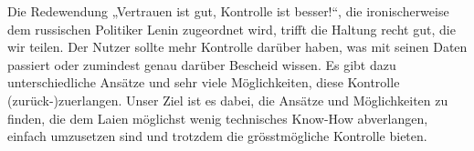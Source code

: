 Die Redewendung „Vertrauen ist gut, Kontrolle ist besser!“, die ironischerweise dem russischen Politiker Lenin zugeordnet wird, trifft die Haltung recht gut, die wir teilen. Der Nutzer sollte mehr Kontrolle darüber haben, was mit seinen Daten passiert oder zumindest genau darüber Bescheid wissen. Es gibt dazu unterschiedliche Ansätze und sehr viele Möglichkeiten, diese Kontrolle (zurück-)zuerlangen. Unser Ziel ist es dabei, die Ansätze und Möglichkeiten zu finden, die dem Laien möglichst wenig technisches Know-How abverlangen, einfach umzusetzen sind und trotzdem die grösstmögliche Kontrolle bieten.

